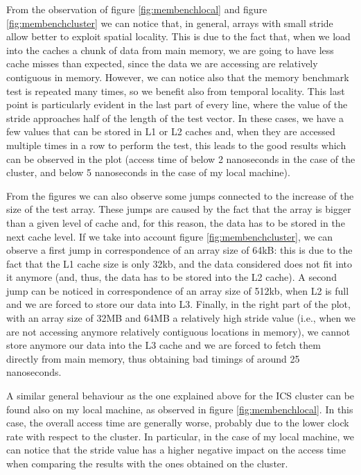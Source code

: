 \documentclass[unicode,11pt,a4paper,oneside,numbers=endperiod,openany]{scrartcl}
\begin{document}
From the observation of figure \ref{fig:membenchlocal} and figure \ref{fig:membenchcluster} we can notice that, in general, arrays with small stride allow better to exploit spatial locality. This is due to the fact that, when we load into the caches a chunk of data from main memory, we are going to have less cache misses than expected, since the data we are accessing are relatively contiguous in memory. However, we can notice also that the memory benchmark test is repeated many times, so we benefit also from temporal locality. This last point is particularly evident in the last part of every line, where the value of the stride approaches half of the length of the test vector. In these cases, we have a few values that can be stored in L1 or L2 caches and, when they are accessed multiple times in a row to perform the test, this leads to the good results which can be observed in the plot (access time of below 2 nanoseconds in the case of the cluster, and below 5 nanoseconds in the case of my local machine).

From the figures we can also observe some jumps connected to the increase of the size of the test array. These jumps are caused by the fact that the array is bigger than a given level of cache and, for this reason, the data has to be stored in the next cache level. If we take into account figure \ref{fig:membenchcluster}, we can observe a first jump in correspondence of an array size of 64kB: this is due to the fact that the L1 cache size is only 32kb, and the data considered does not fit into it anymore (and, thus, the data has to be stored into the L2 cache). A second jump can be noticed in correspondence of an array size of 512kb, when L2 is full and we are forced to store our data into L3. Finally, in the right part of the plot, with an array size of 32MB and 64MB a relatively high stride value (i.e., when we are not accessing anymore relatively contiguous locations in memory), we cannot store anymore our data into the L3 cache and we are forced to fetch them directly from main memory, thus obtaining bad timings of around 25 nanoseconds.

A similar general behaviour as the one explained above for the ICS cluster can be found also on my local machine, as observed in figure \ref{fig:membenchlocal}. In this case, the overall access time are generally worse, probably due to the lower clock rate with respect to the cluster. In particular, in the case of my local machine, we can notice that the stride value has a higher negative impact on the access time when comparing the results with the ones obtained on the cluster.
\end{document}
